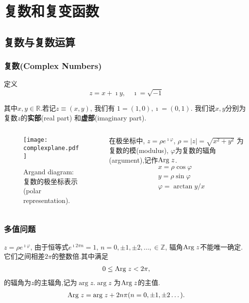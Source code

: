 \section{复数和复变函数}

\subsection{复数与复数运算}

\begin{frame}
\frametitle{复数(Complex Numbers)}

\begin{block}{定义}
    \[
        z = x + \imath y, \quad \imath = \sqrt{-1}
    \] 
\end{block}
其中$x,y \in {\mathbb{R}}$.若记$z \equiv (x,y)$, 我们有
$1 = (1,0), \imath = (0, 1)$.
我们说$x,y$分别为复数$z$的{\bf 实部}(real part) 和{\bf 虚部}(imaginary part).
\begin{columns}
\begin{column}{0.6\textwidth}
    \begin{figure}
        \texttt{[image: complexplane.pdf]}
        \caption{Argand diagram:复数的极坐标表示(polar representation).}
    \end{figure}
\end{column}
\begin{column}{0.4\textwidth}   
     在极坐标中, $z=\rho e^{\imath \varphi}$, $\rho = |z|=\sqrt{x^2 + y^2}$ 为复数的模(modulus), $\varphi$为复数的辐角(argument),记作${\mathrm{Arg}\;} z$.
    \begin{align*}
        & x = \rho \cos\varphi \\
        & y = \rho \sin\varphi \\
        & \varphi = \arctan y/x
    \end{align*}
\end{column}
\end{columns}
\end{frame}


\begin{frame}
    \frametitle{多值问题}
$z=\rho e^{\imath \varphi}$, 由于恒等式$e^{\imath 2\pi n} = 1$, $n = 0, \pm 1, \pm 2, \dots, \in \mathbb{Z}$, 辐角${\mathrm{Arg}\;} z$不能唯一确定.
它们之间相差$2\pi$的整数倍.其中满足
\begin{align*}
    0 \leq {\mathrm{Arg}\;} z < 2\pi,
\end{align*}
的辐角为$z$的主辐角,记为$\arg z$.$\arg z$ 为${\mathrm{Arg}\;} z$的主值.
\begin{align*}
    {\mathrm{Arg}\;} z = {\mathrm{arg}\;} z + 2 n \pi (n = 0, \pm 1, \pm 2\dots).
\end{align*}

\end{frame}



